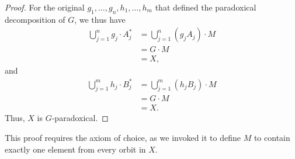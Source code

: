 \begin{proof}
  For the original $g_1,\dots,g_n,h_1,\dots,h_m$ that defined the paradoxical decomposition of $G$, we thus have
  \begin{align*}
    \bigcup_{j=1}^{n}g_j\cdot A_j^{\ast} &= \bigcup_{j=1}^{n}\left(g_jA_j\right)\cdot M\\
                                         &= G\cdot M\\
                                         &= X,
  \end{align*}
  and
  \begin{align*}
    \bigcup_{j=1}^{m}h_j\cdot B_j^{\ast} &= \bigcup_{j=1}^{m}\left(h_jB_j\right)\cdot M\\
                                         &= G\cdot M\\
                                         &= X.
  \end{align*}
  Thus, $X$ is $G$-paradoxical.
\end{proof}
\begin{remark}
  This proof requires the axiom of choice, as we invoked it to define $M$ to contain exactly one element from every orbit in $X$.
\end{remark}

